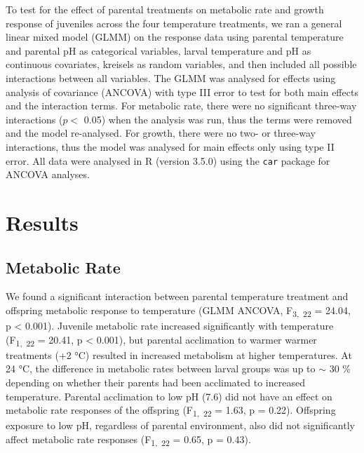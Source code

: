 \documentclass[a4paper,10pt, oneside]{memoir}
\begin{document}
To test for the effect of parental treatments on metabolic rate and growth response of juveniles across the four temperature treatments, we ran a general linear mixed model (GLMM) on the response data using parental temperature and parental pH as categorical variables, larval temperature and pH as continuous covariates, kreisels as random variables, and then included all possible interactions between all variables.
The GLMM was analysed for effects using analysis of covariance (ANCOVA) with type III error to test for both main effects and the interaction terms.
For metabolic rate, there were no significant three-way interactions (\(p <\) 0.05) when the analysis was run, thus the terms were removed and the model re-analysed.
For growth, there were no two- or three-way interactions, thus the model was analysed for main effects only using type II error.
All data were analysed in R (version 3.5.0) using the \texttt{car} package for ANCOVA analyses.

\hypertarget{results-2}{%
\section{Results}\label{results-2}}

\hypertarget{metabolic-rate-4}{%
\subsection{Metabolic Rate}\label{metabolic-rate-4}}

We found a significant interaction between parental temperature treatment and offspring metabolic response to temperature (GLMM ANCOVA, F\textsubscript{3,~22} = 24.04, p \textless{} 0.001).
Juvenile metabolic rate increased significantly with temperature (F\textsubscript{1,~22} = 20.41, p \textless{} 0.001), but parental acclimation to warmer warmer treatments (+2 °C) resulted in increased metabolism at higher temperatures.
At 24 °C, the difference in metabolic rates between larval groups was up to \(\sim\) 30 \% depending on whether their parents had been acclimated to increased temperature.
Parental acclimation to low pH (7.6) did not have an effect on metabolic rate responses of the offspring (F\textsubscript{1,~22} = 1.63, p = 0.22).
Offspring exposure to low pH, regardless of parental environment, also did not significantly affect metabolic rate responses (F\textsubscript{1,~22} = 0.65, p = 0.43).
\end{document}
